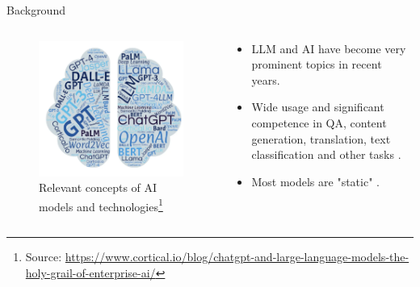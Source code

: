 \documentclass[t]{beamer}
\begin{document}
\begin{frame}{Background}
  \begin{columns}
    \begin{column}{0.4\textwidth}
        \begin{figure}
            \centering
            \includegraphics[width=\textwidth]{llm1.png}
            \caption{Relevant concepts of AI models and technologies\footnote{Source: \url{https://www.cortical.io/blog/chatgpt-and-large-language-models-the-holy-grail-of-enterprise-ai/}}}
            \label{fig:llm1}
        \end{figure}
    \end{column}
    \begin{column}{0.5\textwidth}
        \begin{itemize}
            \item LLM and AI have become very prominent topics in recent years.
            \newline
            \item Wide usage and significant competence in QA, content generation, translation, text classification and other tasks \cite{Liu23}.
            \newline
            \item Most models are "static" \cite{Gupta23}.
        \end{itemize}
    \end{column}
\end{columns}
\end{frame}
\end{document}
